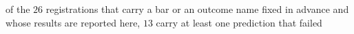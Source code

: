 of the $26$ registrations that carry a bar or an outcome name fixed in advance and whose results are reported here, $13$ carry at least one prediction that failed